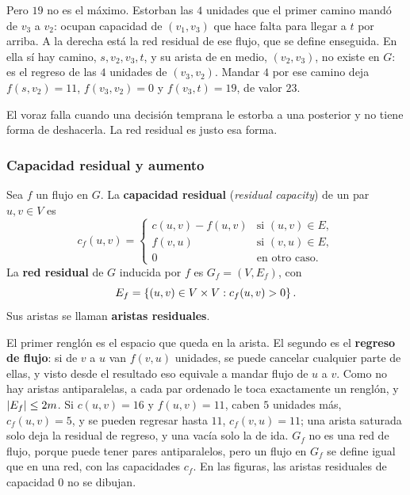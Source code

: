 \documentclass[11pt,letterpaper]{article}
\begin{document}
\begin{ejemplo}
\begin{center}
  \end{center}
  Pero $19$ no es el máximo. Estorban las $4$ unidades que el primer
  camino mandó de $v_3$ a $v_2$: ocupan capacidad de $(v_1, v_3)$ que
  hace falta para llegar a $t$ por arriba. A la derecha está la red
  residual de ese flujo, que se define enseguida. En ella sí hay
  camino, $s, v_2, v_3, t$, y su arista de en medio, $(v_2, v_3)$, no
  existe en $G$: es el regreso de las $4$ unidades de $(v_3, v_2)$.
  Mandar $4$ por ese camino deja $f(s, v_2) = 11$, $f(v_3, v_2) = 0$ y
  $f(v_3, t) = 19$, de valor $23$.
\end{ejemplo}

El voraz falla cuando una decisión temprana le estorba a una
posterior y no tiene forma de deshacerla. La red residual es justo esa
forma.

\subsubsection*{Capacidad residual y aumento}

\begin{definicion}\label{def:red-residual}
  Sea $f$ un flujo en $G$. La \textbf{capacidad residual}
  (\textit{residual capacity}) de un par $u, v \in V$ es
  \[
    c_f(u, v) =
    \begin{cases}
      c(u, v) - f(u, v) & \text{si } (u, v) \in E , \\
      f(v, u)           & \text{si } (v, u) \in E , \\
      0                 & \text{en otro caso.}
    \end{cases}
  \]
  La \textbf{red residual} de $G$ inducida por $f$ es
  $G_f = (V, E_f)$, con
  \[
    E_f = \left\{ (u, v) \in V \times V : c_f(u, v) > 0 \right\} .
  \]
  Sus aristas se llaman \textbf{aristas residuales}.
\end{definicion}

El primer renglón es el espacio que queda en la arista. El segundo es
el \textbf{regreso de flujo}: si de $v$ a $u$ van $f(v, u)$ unidades,
se puede cancelar cualquier parte de ellas, y visto desde el resultado
eso equivale a mandar flujo de $u$ a $v$. Como no hay aristas
antiparalelas, a cada par ordenado le toca exactamente un renglón, y
$\left\lvert E_f \right\rvert \le 2m$. Si $c(u, v) = 16$ y $f(u, v) = 11$, caben $5$
unidades más, $c_f(u, v) = 5$, y se pueden regresar hasta $11$,
$c_f(v, u) = 11$; una arista saturada solo deja la residual de
regreso, y una vacía solo la de ida. $G_f$ no es una red de flujo,
porque puede tener pares antiparalelos, pero un flujo en $G_f$ se
define igual que en una red, con las capacidades $c_f$. En las
figuras, las aristas residuales de capacidad $0$ no se dibujan.
\end{document}
